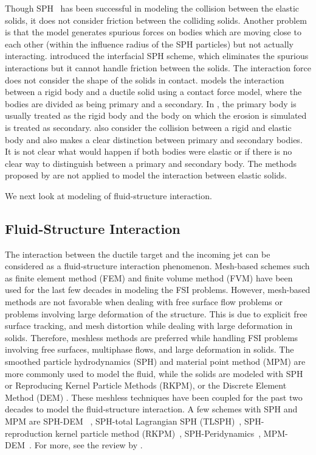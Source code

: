 Though SPH~\parencite{gray2001sph} has been successful in modeling the collision
between the elastic solids, it does not consider friction between the colliding
solids. Another problem is that the model generates spurious forces on bodies
which are moving close to each other (within the influence radius of the SPH
particles) but not actually interacting. \textcite{yan2021simulation} introduced the
interfacial SPH scheme, which eliminates the spurious interactions but it cannot
handle friction between the solids. The interaction force does not consider the
shape of the solids in contact. \textcite{mohseni2021particle} models the
interaction between a rigid body and a ductile solid using a contact force
model, where the bodies are divided as being primary and a secondary. In
\parencite{mohseni2021particle}, the primary body is usually treated as the rigid
body and the body on which the erosion is simulated is treated as secondary.
\textcite{vyas2021collisional} also consider the collision between a rigid and
elastic body and also makes a clear distinction between primary and secondary
bodies. It is not clear what would happen if both bodies were elastic or if
there is no clear way to distinguish between a primary and secondary body. The
methods proposed by \textcite{vyas2021collisional,mohseni2021particle} are not
applied to model the interaction between elastic solids.

We next look at modeling of fluid-structure interaction.


\subsection{Fluid-Structure Interaction}
The interaction between the ductile target and the incoming jet can be
considered as a fluid-structure interaction phenomenon. Mesh-based schemes such
as finite element method (FEM) \parencite{lozovskiy2015unconditionally} and finite
volume method (FVM) \parencite{jasak2007updated} have been used for the last few
decades in modeling the FSI problems. However, mesh-based methods are not
favorable when dealing with free surface flow problems or problems involving
large deformation of the structure. This is due to explicit free surface
tracking, and mesh distortion \parencite{moresi2003lagrangian} while dealing with
large deformation in solids. Therefore, meshless methods are preferred while
handling FSI problems involving free surfaces, multiphase flows, and large
deformation in solids. The smoothed particle hydrodynamics (SPH) and material
point method (MPM) are more commonly used to model the fluid, while the
solids are modeled with SPH or Reproducing Kernel Particle Methods (RKPM), or
the Discrete Element Method (DEM) \parencite{hu2010material,li2022material}. These
meshless techniques have been coupled for the past two decades to model the
fluid-structure interaction. A few schemes with SPH and MPM are SPH-DEM~
\parencite{wu2016coupled}, SPH-total Lagrangian SPH
(TLSPH)~\parencite{salehizadeh2022coupled}, SPH-reproduction kernel particle method
(RKPM)~\parencite{peng2021coupling}, SPH-Peridynamics~\parencite{sun2020smoothed},
MPM-DEM~\parencite{singer2022partitioned}. For more, see the review by
\parencite{khayyer2022systematic}.

